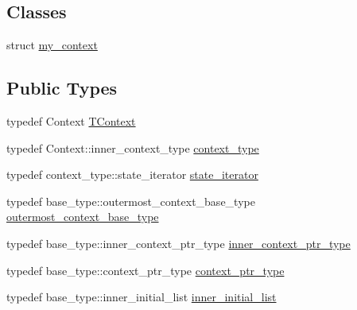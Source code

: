 \subsection*{Classes}
\begin{DoxyCompactItemize}
\item 
struct \hyperlink{structsmacc_1_1SmaccState_1_1my__context}{my\+\_\+context}
\end{DoxyCompactItemize}
\subsection*{Public Types}
\begin{DoxyCompactItemize}
\item 
typedef Context \hyperlink{classsmacc_1_1SmaccState_a9953ba0428a8c46f7d72c70bc3f87db4}{T\+Context}
\item 
typedef Context\+::inner\+\_\+context\+\_\+type \hyperlink{classsmacc_1_1SmaccState_a65c128d05dbcadbf817f41ba20b8fa01}{context\+\_\+type}
\item 
typedef context\+\_\+type\+::state\+\_\+iterator \hyperlink{classsmacc_1_1SmaccState_a12497b38e710f07cacb5d45efc024339}{state\+\_\+iterator}
\item 
typedef base\+\_\+type\+::outermost\+\_\+context\+\_\+base\+\_\+type \hyperlink{classsmacc_1_1SmaccState_aaf76bbe2aa9dd73e3284605f84ab4b16}{outermost\+\_\+context\+\_\+base\+\_\+type}
\item 
typedef base\+\_\+type\+::inner\+\_\+context\+\_\+ptr\+\_\+type \hyperlink{classsmacc_1_1SmaccState_a65a772c2e2039e9a59148ba6ffb54d8a}{inner\+\_\+context\+\_\+ptr\+\_\+type}
\item 
typedef base\+\_\+type\+::context\+\_\+ptr\+\_\+type \hyperlink{classsmacc_1_1SmaccState_a0e15b77514301039f6bc093a9d3f6425}{context\+\_\+ptr\+\_\+type}
\item 
typedef base\+\_\+type\+::inner\+\_\+initial\+\_\+list \hyperlink{classsmacc_1_1SmaccState_acb4ac84bce421d39b594510a6b2df558}{inner\+\_\+initial\+\_\+list}
\end{DoxyCompactItemize}
